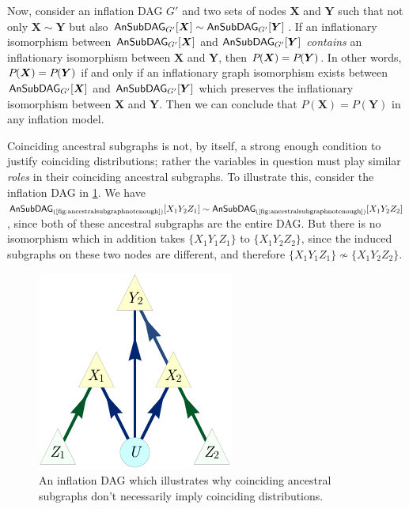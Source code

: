 \begin{asparadesc}
Now, consider an inflation DAG $G'$ and two sets of nodes $\bm{X}$ and $\bm{Y}$ such that not only $\bm{X}\sim\bm{Y}$ but also $\ansubgraph[G']{\bm{X}}\sim\ansubgraph[G']{\bm{Y}}$. If an inflationary isomorphism between $\ansubgraph[G']{\bm{X}}$ and $\ansubgraph[G']{\bm{Y}}$ \emph{contains} an inflationary isomorphism between $\bm{X}$ and $\bm{Y}$, then $\pdf{\bm{X}}=\pdf{\bm{Y}}$. In other words, $\pdf{\bm{X}}=\pdf{\bm{Y}}$ if and only if an inflationary graph isomorphism exists between $\ansubgraph[G']{\bm{X}}$ and $\ansubgraph[G']{\bm{Y}}$ which preserves the inflationary isomorphism between $\bm{X}$ and $\bm{Y}$. Then we can conclude that $P(\bm{X}) = P(\bm{Y})$ in any inflation model.

Coinciding ancestral subgraphs is not, by itself, a strong enough condition to justify coinciding distributions; rather the variables in question must play similar \emph{roles} in their coinciding ancestral subgraphs. To illustrate this, consider the inflation DAG in \cref{fig:ancestralsubgraphnotenough}. We have $\ansubgraph[(\textrm{\cref{fig:ancestralsubgraphnotenough}})]{X_1 Y_2 Z_1}\sim\ansubgraph[(\textrm{\cref{fig:ancestralsubgraphnotenough}})]{X_1 Y_2 Z_2}$, since both of these ancestral subgraphs are the entire DAG. But there is no isomorphism which in addition takes $\{X_1 Y_1 Z_1\}$ to $\{X_1 Y_2 Z_2\}$, since the induced subgraphs on these two nodes are different, and therefore $\{X_1 Y_1 Z_1\}\not\sim\{X_1 Y_2 Z_2\}$.

\begin{figure}[H]
    \centering
    \begin{minipage}[t]{0.6\linewidth}      \centering
    \includegraphics[scale=1]{instrumentalvariant.pdf}
    \caption{An inflation DAG which illustrates why coinciding ancestral subgraphs don't necessarily imply coinciding distributions.}
    \label{fig:ancestralsubgraphnotenough}
    \end{minipage}
\end{figure}


\end{asparadesc}
